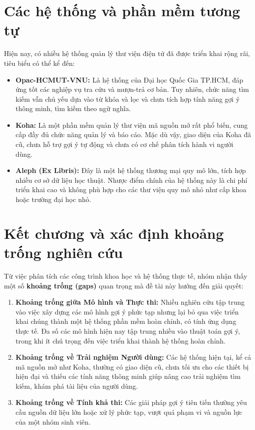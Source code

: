 \section{Các hệ thống và phần mềm tương tự}

Hiện nay, có nhiều hệ thống quản lý thư viện điện tử đã được triển khai rộng rãi, tiêu biểu có thể kể đến:

\begin{itemize}
    \item \textbf{Opac-HCMUT-VNU:} Là hệ thống của Đại học Quốc Gia TP.HCM, đáp ứng tốt các nghiệp vụ tra cứu và mượn-trả cơ bản. Tuy nhiên, chức năng tìm kiếm vẫn chủ yếu dựa vào từ khóa và lọc và chưa tích hợp tính năng gợi ý thông minh, tìm kiếm theo ngữ nghĩa.
    
    \item \textbf{Koha:} Là một phần mềm quản lý thư viện mã nguồn mở rất phổ biến, cung cấp đầy đủ chức năng quản lý và báo cáo. Mặc dù vậy, giao diện của Koha đã cũ, chưa hỗ trợ gợi ý tự động và chưa có cơ chế phân tích hành vi người dùng.
    
    \item \textbf{Aleph (Ex Libris):} Đây là một hệ thống thương mại quy mô lớn, tích hợp nhiều cơ sở dữ liệu học thuật. Nhược điểm chính của hệ thống này là chi phí triển khai cao và không phù hợp cho các thư viện quy mô nhỏ như cấp khoa hoặc trường đại học nhỏ.
\end{itemize}

\section{Kết chương và xác định khoảng trống nghiên cứu}

Từ việc phân tích các công trình khoa học và hệ thống thực tế, nhóm nhận thấy một số \textbf{khoảng trống (gaps)} quan trọng mà đề tài này hướng đến giải quyết:

\begin{enumerate}
    \item \textbf{Khoảng trống giữa Mô hình và Thực thi:} Nhiều nghiên cứu tập trung vào việc xây dựng các mô hình gợi ý phức tạp nhưng lại bỏ qua việc triển khai chúng thành một hệ thống phần mềm hoàn chỉnh, có tính ứng dụng thực tế. Đa số các mô hình hiện nay tập trung nhiều vào thuật toán gợi ý, trong khi ít chú trọng đến việc triển khai thành hệ thống hoàn chỉnh.
    
    \item \textbf{Khoảng trống về Trải nghiệm Người dùng:} Các hệ thống hiện tại, kể cả mã nguồn mở như Koha, thường có giao diện cũ, chưa tối ưu cho các thiết bị hiện đại và thiếu các tính năng thông minh giúp nâng cao trải nghiệm tìm kiếm, khám phá tài liệu của người dùng.
    
    \item \textbf{Khoảng trống về Tính khả thi:} Các giải pháp gợi ý tiên tiến thường yêu cầu nguồn dữ liệu lớn hoặc xử lý phức tạp, vượt quá phạm vi và nguồn lực của một nhóm sinh viên.
\end{enumerate}

